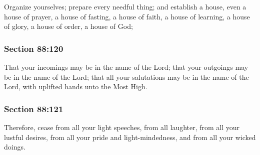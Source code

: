 		Organize yourselves; prepare every needful thing; and establish a house, even a house of prayer, a house of fasting, a house of faith, a house of learning, a house of glory, a house of order, a house of God;


	\subsubsection{Section 88:120} %
		\label{DC88-120}

		That your incomings may be in the name of the Lord; that your outgoings may be in the name of the Lord; that all your salutations may be in the name of the Lord, with uplifted hands unto the Most High.


	\subsubsection{Section 88:121} %
		\label{DC88-121}

		Therefore, cease from all your light speeches, from all laughter, from all your lustful desires, from all your pride and light-mindedness, and from all your wicked doings.


